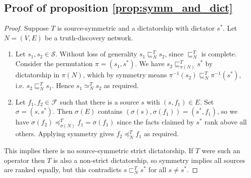 \documentclass{article}
\theoremstyle{definition} \newtheorem{definition}{Definition}
\theoremstyle{definition} \newtheorem{example}{Example}
\theoremstyle{plain} \newtheorem{axiom}{Axiom}
\theoremstyle{plain} \newtheorem*{remark}{Remark}
\theoremstyle{remark} \newtheorem*{notation}{Notation}
\theoremstyle{plain} \newtheorem{lemma}{Lemma}
\theoremstyle{plain} \newtheorem{theorem}{Theorem}
\theoremstyle{plain} \newtheorem{proposition}{Proposition}
\renewcommand{\S}{\mathcal{S}}  %
\newcommand{\F}{\mathcal{F}}
\newcommand{\sle}{\sqsubseteq}
\newcommand{\slt}{\sqsubset}
\newcommand{\seq}{\simeq}
\newcommand{\fle}{\preceq}
\begin{document}
\subsection{Proof of proposition \ref{prop:symm_and_dict}}
\begin{proof}

Suppose $T$ is source-symmetric and a dictatorship with dictator $s^*$. Let
$N=(V,E)$ be a truth-discovery network.
\begin{enumerate}
\item
    Let $s_1, s_2 \in \S$. Without loss of generality $s_1 \sle_N^T s_2$, since
    $\sle_N^T$ is complete. Consider the permutation $\pi=(s_1, s^*)$.  We have
    $s_2 \sle_{\pi(N)}^T s^*$ by dictatorship in $\pi(N)$, which by symmetry
    means $\pi^{-1}(s_2) \sle_N^T \pi^{-1}(s^*)$, i.e. $s_2 \sle_N^T s_1$.
    Hence $s_1 \seq_N^T s_2$ as required.

\item
    Let $f_1, f_2 \in \F$ such that there is a source $s$ with $(s, f_1) \in E$.
    Set $\sigma=(s, s^*)$. Then $\sigma(E)$ contains $(\sigma(s), \sigma(f_1))
    = (s^*, f_1)$, so we have $\sigma(f_2) \fle_{\sigma(N)}^T f_1 =
    \sigma(f_1)$ since the facts claimed by $s^*$ rank above all others.
    Applying symmetry gives $f_2 \fle_N^T f_1$ as required.
\end{enumerate}

This implies there is no source-symmetric strict dictatorship. If $T$ were such
an operator then $T$ is also a non-strict dictatorship, so symmetry implies
all sources are ranked equally, but this contradicts $s \slt_N^T s^*$ for all
$s \ne s^*$.

\end{proof}
\end{document}
